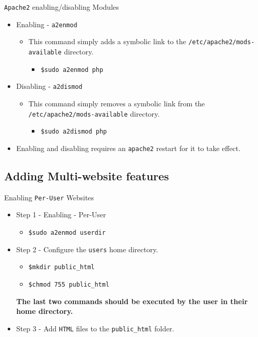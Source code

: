 \documentclass[xcolor=table]{beamer}
\begin{document}
\begin{frame}{\texttt{Apache2} enabling/disabling Modules}
  \begin{itemize}
    \item Enabling - \texttt{a2enmod}
      \begin{itemize}
        \item This command simply adds a symbolic link to the \texttt{/etc/apache2/mods-available} directory.
          \begin{itemize}
            \item \texttt{\$sudo a2enmod php}
          \end{itemize}
        \end{itemize}
    \item Disabling - \texttt{a2dismod}
        \begin{itemize}
          \item This command simply removes a symbolic link from the \texttt{/etc/apache2/mods-available} directory.
            \begin{itemize}
              \item \texttt{\$sudo a2dismod php}
            \end{itemize}
          \end{itemize}
    \item Enabling and disabling requires an \texttt{apache2} restart for it to take effect.
  \end{itemize}
\end{frame}

\subsection{Adding Multi-website features}
\begin{frame}{Enabling \texttt{Per-User} Websites}
   \begin{itemize}
      \item Step 1 - Enabling - Per-User
        \begin{itemize}
          \item \texttt{\$sudo a2enmod userdir}
        \end{itemize}
      \item  Step 2 - Configure the \texttt{users} home directory.
        \begin{itemize}
          \item \texttt{\$mkdir public\_html} 
          \item \texttt{\$chmod 755 public\_html}
        \end{itemize}
        \begin{tcolorbox}
          \begin{center}
            \scriptsize \textbf{The last two commands should be executed by the user in their home directory.}
          \end{center}
        \end{tcolorbox}
      \item  Step 3 - Add \texttt{HTML} files to the \texttt{public\_html} folder.
    \end{itemize}
\end{frame}
\end{document}
